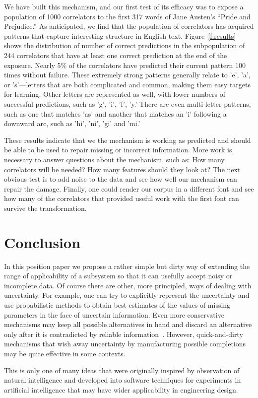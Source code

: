 \documentclass[letterpaper]{article}
\begin{document}
We have built this mechanism, and our first test of its efficacy was
to expose a population of 1000 correlators to the first 317 words of
Jane Austen's ``Pride and Prejudice.''  As anticipated, we find that
the population of correlators has acquired patterns that capture
interesting structure in English text.  Figure~\ref{f:results} shows
the distribution of number of correct predictions in the subpopulation
of 244 correlators that have at least one correct prediction at the
end of the exposure.  Nearly 5\% of the correlators have predicted
their current pattern 100 times without failure.  These extremely
strong patterns generally relate to 'e', 'a', or 's'---letters that
are both complicated and common, making them easy targets for
learning.  Other letters are represented as well, with lower numbers
of successful predictions, such as 'g', 'i', 'f', 'y.'  There are even
multi-letter patterns, such as one that matches 'as' and another that
matches an 'i' following a downward arc, such as 'hi', 'ni', 'gi' and
'mi.'

These results indicate that we the mechanism is working as predicted
and should be able to be used to repair missing or incorrect
information.  More work is necessary to answer questions about the
mechanism, such as: How many correlators will be needed?  How many
features should they look at?  The next obvious test is to add noise
to the data and see how well our mechanism can repair the damage.
Finally, one could render our corpus in a different font and see how
many of the correlators that provided useful work with the first font
can survive the transformation.




\section{Conclusion}

In this position paper we propose a rather simple but dirty way of
extending the range of applicability of a subsystem so that it can
usefully accept noisy or incomplete data.  Of course there are other,
more principled, ways of dealing with uncertainty.  For example, one
can try to explicitly represent the uncertainty and use probabilistic
methods to obtain best estimates of the values of missing parameters
in the face of uncertain information.  Even more conservative
mechanisms may keep all possible alternatives in hand and discard an
alternative only after it is contradicted by reliable
information~\cite{waltz}. However, quick-and-dirty mechanisms that
wish away uncertainty by manufacturing possible completions may be
quite effective in some contexts.

This is only one of many ideas that were originally inspired by
observation of natural intelligence and developed into software
techniques for experiments in artificial intelligence that may have
wider applicability in engineering design.



\end{document}
